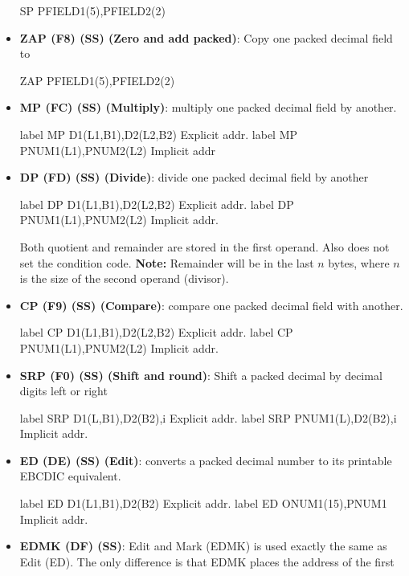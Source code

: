 \documentclass{report}
\begin{document}
\begin{itemize}
\begin{cppcode}
                SP PFIELD1(5),PFIELD2(2)
            \end{cppcode}
        \item \textbf{ZAP (F8) (SS) (Zero and add packed)}: Copy one packed decimal field to
            \bigbreak \noindent 
            \begin{cppcode}
                ZAP PFIELD1(5),PFIELD2(2)
            \end{cppcode}
        \item \textbf{MP (FC) (SS) (Multiply)}: multiply one packed decimal field by another.
            \bigbreak \noindent 
            \begin{cppcode}
                label MP D1(L1,B1),D2(L2,B2) Explicit addr.
                label MP PNUM1(L1),PNUM2(L2) Implicit addr
            \end{cppcode}
        \item \textbf{DP (FD) (SS) (Divide)}: divide one packed decimal field by another
            \bigbreak \noindent 
            \begin{cppcode}
                label DP D1(L1,B1),D2(L2,B2) Explicit addr.
                label DP PNUM1(L1),PNUM2(L2) Implicit addr.
            \end{cppcode}
            \bigbreak \noindent 
            Both quotient and remainder are stored in the first operand. Also does not set the condition code.
            \bigbreak \noindent 
            \textbf{Note:} Remainder will be in the last $n$ bytes, where $n$ is the size of the second operand (divisor).
        \item \textbf{CP (F9) (SS) (Compare)}: compare one packed decimal field with another.
            \bigbreak \noindent 
            \begin{cppcode}
                label CP D1(L1,B1),D2(L2,B2) Explicit addr.
                label CP PNUM1(L1),PNUM2(L2) Implicit addr.
            \end{cppcode}
        \item \textbf{SRP (F0) (SS) (Shift and round)}: Shift a packed decimal by decimal digits left or right
            \bigbreak \noindent 
            \begin{cppcode}
                label SRP D1(L,B1),D2(B2),i Explicit addr.
                label SRP PNUM1(L),D2(B2),i Implicit addr.
            \end{cppcode}
        \item \textbf{ED (DE) (SS) (Edit)}: converts a packed decimal number to its printable EBCDIC equivalent.
            \bigbreak \noindent 
            \begin{cppcode}
                label ED D1(L1,B1),D2(B2) Explicit addr.
                label ED ONUM1(15),PNUM1 Implicit addr.
            \end{cppcode}
        \item \textbf{EDMK (DF) (SS)}: Edit and Mark (EDMK) is used exactly the same as Edit (ED). The only difference is that EDMK places the address of the first

    \end{itemize}
\end{document}
